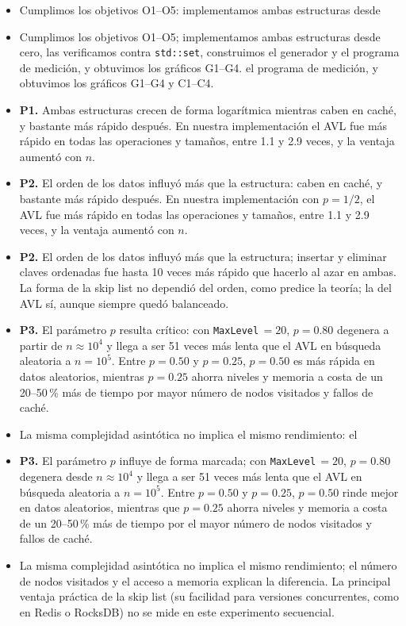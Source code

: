 \documentclass[11pt,a4paper]{article}
\begin{document}
\begin{itemize}
  \item Cumplimos los objetivos O1--O5: implementamos ambas estructuras desde
  \item Cumplimos los objetivos O1--O5; implementamos ambas estructuras desde
  cero, las verificamos contra \texttt{std::set}, construimos el generador y
  el programa de medición, y obtuvimos los gráficos G1--G4.
  el programa de medición, y obtuvimos los gráficos G1--G4 y C1--C4.
  \item \textbf{P1.} Ambas estructuras crecen de forma logarítmica mientras
  caben en caché, y bastante más rápido después. En nuestra implementación el
  AVL fue más rápido en todas las operaciones y tamaños, entre 1.1 y 2.9 veces,
  y la ventaja aumentó con $n$.
  \item \textbf{P2.} El orden de los datos influyó más que la estructura:
  caben en caché, y bastante más rápido después. En nuestra implementación con
  $p = 1/2$, el AVL fue más rápido en todas las operaciones y tamaños, entre
  1.1 y 2.9 veces, y la ventaja aumentó con $n$.
  \item \textbf{P2.} El orden de los datos influyó más que la estructura;
  insertar y eliminar claves ordenadas fue hasta 10 veces más rápido que
  hacerlo al azar en ambas. La forma de la skip list no dependió del orden,
  como predice la teoría; la del AVL sí, aunque siempre quedó balanceado.
  \item \textbf{P3.} El parámetro $p$ resulta crítico: con \texttt{MaxLevel}$\,=20$,
  $p=0.80$ degenera a partir de $n \approx 10^4$ y llega a ser 51 veces más
  lenta que el AVL en búsqueda aleatoria a $n=10^5$. Entre $p=0.50$ y $p=0.25$,
  $p=0.50$ es más rápida en datos aleatorios, mientras $p=0.25$ ahorra niveles
  y memoria a costa de un 20--50\,\% más de tiempo por mayor número de nodos
  visitados y fallos de caché.
  \item La misma complejidad asintótica no implica el mismo rendimiento: el
  \item \textbf{P3.} El parámetro $p$ influye de forma marcada; con
  \texttt{MaxLevel}$\,=20$, $p=0.80$ degenera desde $n \approx 10^4$ y llega a
  ser 51 veces más lenta que el AVL en búsqueda aleatoria a $n=10^5$. Entre
  $p=0.50$ y $p=0.25$, $p=0.50$ rinde mejor en datos aleatorios, mientras que
  $p=0.25$ ahorra niveles y memoria a costa de un 20--50\,\% más de tiempo por
  el mayor número de nodos visitados y fallos de caché.
  \item La misma complejidad asintótica no implica el mismo rendimiento; el
  número de nodos visitados y el acceso a memoria explican la diferencia. La
  principal ventaja práctica de la skip list (su facilidad para versiones
  concurrentes, como en Redis o RocksDB) no se mide en este experimento
  secuencial.
\end{itemize}
\end{document}
